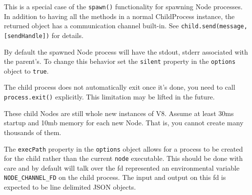 This is a special case of the \texttt{spawn()} functionality for
spawning Node processes. In addition to having all the methods in a
normal ChildProcess instance, the returned object has a communication
channel built-in. See \texttt{child.send(message, {[}sendHandle{]})} for
details.

By default the spawned Node process will have the stdout, stderr
associated with the parent's. To change this behavior set the
\texttt{silent} property in the \texttt{options} object to
\texttt{true}.

The child process does not automatically exit once it's done, you need
to call \texttt{process.exit()} explicitly. This limitation may be
lifted in the future.

These child Nodes are still whole new instances of V8. Assume at least
30ms startup and 10mb memory for each new Node. That is, you cannot
create many thousands of them.

The \texttt{execPath} property in the \texttt{options} object allows for
a process to be created for the child rather than the current
\texttt{node} executable. This should be done with care and by default
will talk over the fd represented an environmental variable
\texttt{NODE\_CHANNEL\_FD} on the child process. The input and output on
this fd is expected to be line delimited JSON objects.
